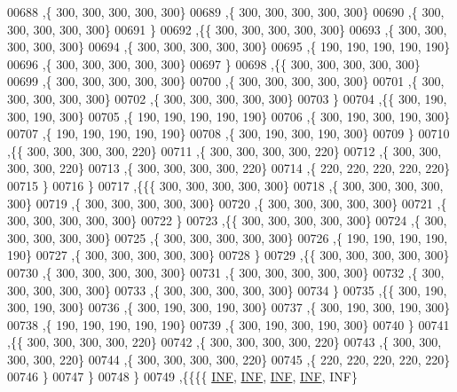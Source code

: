 \begin{DoxyCode}
00688    ,\{   300,   300,   300,   300,   300\}
00689    ,\{   300,   300,   300,   300,   300\}
00690    ,\{   300,   300,   300,   300,   300\}
00691    \}
00692   ,\{\{   300,   300,   300,   300,   300\}
00693    ,\{   300,   300,   300,   300,   300\}
00694    ,\{   300,   300,   300,   300,   300\}
00695    ,\{   190,   190,   190,   190,   190\}
00696    ,\{   300,   300,   300,   300,   300\}
00697    \}
00698   ,\{\{   300,   300,   300,   300,   300\}
00699    ,\{   300,   300,   300,   300,   300\}
00700    ,\{   300,   300,   300,   300,   300\}
00701    ,\{   300,   300,   300,   300,   300\}
00702    ,\{   300,   300,   300,   300,   300\}
00703    \}
00704   ,\{\{   300,   190,   300,   190,   300\}
00705    ,\{   190,   190,   190,   190,   190\}
00706    ,\{   300,   190,   300,   190,   300\}
00707    ,\{   190,   190,   190,   190,   190\}
00708    ,\{   300,   190,   300,   190,   300\}
00709    \}
00710   ,\{\{   300,   300,   300,   300,   220\}
00711    ,\{   300,   300,   300,   300,   220\}
00712    ,\{   300,   300,   300,   300,   220\}
00713    ,\{   300,   300,   300,   300,   220\}
00714    ,\{   220,   220,   220,   220,   220\}
00715    \}
00716   \}
00717  ,\{\{\{   300,   300,   300,   300,   300\}
00718    ,\{   300,   300,   300,   300,   300\}
00719    ,\{   300,   300,   300,   300,   300\}
00720    ,\{   300,   300,   300,   300,   300\}
00721    ,\{   300,   300,   300,   300,   300\}
00722    \}
00723   ,\{\{   300,   300,   300,   300,   300\}
00724    ,\{   300,   300,   300,   300,   300\}
00725    ,\{   300,   300,   300,   300,   300\}
00726    ,\{   190,   190,   190,   190,   190\}
00727    ,\{   300,   300,   300,   300,   300\}
00728    \}
00729   ,\{\{   300,   300,   300,   300,   300\}
00730    ,\{   300,   300,   300,   300,   300\}
00731    ,\{   300,   300,   300,   300,   300\}
00732    ,\{   300,   300,   300,   300,   300\}
00733    ,\{   300,   300,   300,   300,   300\}
00734    \}
00735   ,\{\{   300,   190,   300,   190,   300\}
00736    ,\{   300,   190,   300,   190,   300\}
00737    ,\{   300,   190,   300,   190,   300\}
00738    ,\{   190,   190,   190,   190,   190\}
00739    ,\{   300,   190,   300,   190,   300\}
00740    \}
00741   ,\{\{   300,   300,   300,   300,   220\}
00742    ,\{   300,   300,   300,   300,   220\}
00743    ,\{   300,   300,   300,   300,   220\}
00744    ,\{   300,   300,   300,   300,   220\}
00745    ,\{   220,   220,   220,   220,   220\}
00746    \}
00747   \}
00748  \}
00749 ,\{\{\{\{   \hyperlink{energy__const_8h_a12c2040f25d8e3a7b9e1c2024c618cb6}{INF},   \hyperlink{energy__const_8h_a12c2040f25d8e3a7b9e1c2024c618cb6}{INF},   \hyperlink{energy__const_8h_a12c2040f25d8e3a7b9e1c2024c618cb6}{INF},   \hyperlink{energy__const_8h_a12c2040f25d8e3a7b9e1c2024c618cb6}{INF},   INF\}

\end{DoxyCode}
